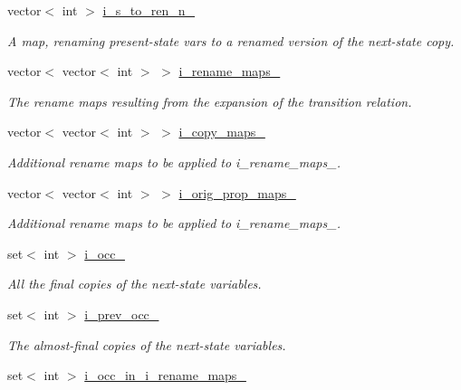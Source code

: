 \begin{DoxyCompactItemize}
vector$<$ int $>$ \hyperlink{classUnivExpander_a150474e2dd386599d750453eec601ec2}{i\-\_\-s\-\_\-to\-\_\-ren\-\_\-n\-\_\-}
\begin{DoxyCompactList}\small\item\em A map, renaming present-\/state vars to a renamed version of the next-\/state copy. \end{DoxyCompactList}\item 
vector$<$ vector$<$ int $>$ $>$ \hyperlink{classUnivExpander_a8e3bf04d83d2164635bdc57d78617219}{i\-\_\-rename\-\_\-maps\-\_\-}
\begin{DoxyCompactList}\small\item\em The rename maps resulting from the expansion of the transition relation. \end{DoxyCompactList}\item 
vector$<$ vector$<$ int $>$ $>$ \hyperlink{classUnivExpander_a7a67805b87282a1dcfcb25c33c04837d}{i\-\_\-copy\-\_\-maps\-\_\-}
\begin{DoxyCompactList}\small\item\em Additional rename maps to be applied to i\-\_\-rename\-\_\-maps\-\_\-. \end{DoxyCompactList}\item 
vector$<$ vector$<$ int $>$ $>$ \hyperlink{classUnivExpander_a56e747b1df6cfd250707384b593b13a7}{i\-\_\-orig\-\_\-prop\-\_\-maps\-\_\-}
\begin{DoxyCompactList}\small\item\em Additional rename maps to be applied to i\-\_\-rename\-\_\-maps\-\_\-. \end{DoxyCompactList}\item 
set$<$ int $>$ \hyperlink{classUnivExpander_ae1f970b4ccd465626cdb1fb8978f9fae}{i\-\_\-occ\-\_\-}
\begin{DoxyCompactList}\small\item\em All the final copies of the next-\/state variables. \end{DoxyCompactList}\item 
set$<$ int $>$ \hyperlink{classUnivExpander_a02bc6eec7ce33effdac18b8b1c0bd770}{i\-\_\-prev\-\_\-occ\-\_\-}
\begin{DoxyCompactList}\small\item\em The almost-\/final copies of the next-\/state variables. \end{DoxyCompactList}\item 
set$<$ int $>$ \hyperlink{classUnivExpander_a44acd8709f042e39071913fb12303b0d}{i\-\_\-occ\-\_\-in\-\_\-i\-\_\-rename\-\_\-maps\-\_\-}

\end{DoxyCompactItemize}
